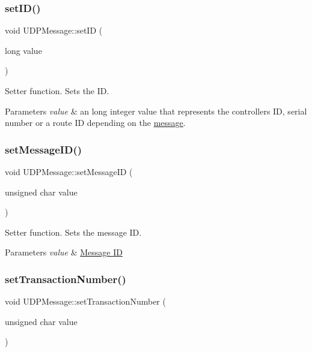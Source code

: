 \subsubsection{\texorpdfstring{set\+I\+D()}{setID()}}
{\footnotesize\ttfamily void U\+D\+P\+Message\+::set\+ID (\begin{DoxyParamCaption}\item[{long}]{value }\end{DoxyParamCaption})\hspace{0.3cm}{\ttfamily [inline]}}

Setter function. Sets the ID. 
\begin{DoxyParams}{Parameters}
{\em value} & an long integer value that represents the controller\textquotesingle{}s ID, serial number or a route ID depending on the \hyperlink{group___u_d_p_message_i_d}{message}. \\
\hline
\end{DoxyParams}
\mbox{\label{class_u_d_p_message_aba4aadebe7b1aa92ba558f3cd4319e79}} 
\subsubsection{\texorpdfstring{set\+Message\+I\+D()}{setMessageID()}}
{\footnotesize\ttfamily void U\+D\+P\+Message\+::set\+Message\+ID (\begin{DoxyParamCaption}\item[{unsigned char}]{value }\end{DoxyParamCaption})\hspace{0.3cm}{\ttfamily [inline]}}

Setter function. Sets the message ID. 
\begin{DoxyParams}{Parameters}
{\em value} & \hyperlink{group___u_d_p_message_i_d}{Message ID} \\
\hline
\end{DoxyParams}
\mbox{\label{class_u_d_p_message_a27629d5cab43160d53cedfd894e1c216}} 
\subsubsection{\texorpdfstring{set\+Transaction\+Number()}{setTransactionNumber()}}
{\footnotesize\ttfamily void U\+D\+P\+Message\+::set\+Transaction\+Number (\begin{DoxyParamCaption}\item[{unsigned char}]{value }\end{DoxyParamCaption})\hspace{0.3cm}{\ttfamily [inline]}}

